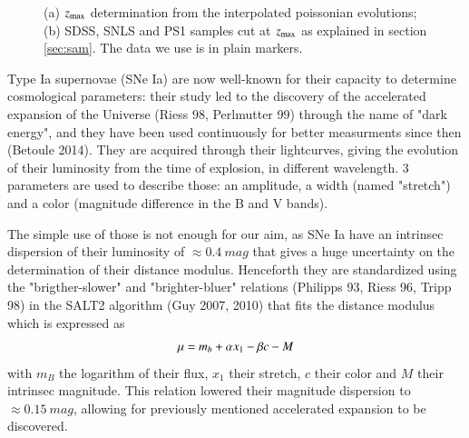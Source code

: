 \documentclass{aa}
\begin{document}
\begin{figure}[htbp!]
    \centering
    \caption{(a) $z_{\text{max}}$ determination from the interpolated poissonian
    evolutions; (b) SDSS, SNLS and PS1 samples cut at $z_{\text{max}}$ as explained in
    section \ref{sec:sam}. The data we use is in plain markers.}
\end{figure}

Type Ia supernovae (SNe Ia) are now well-known for their capacity to determine
cosmological parameters: their study led to the discovery of the accelerated
expansion of the Universe (Riess 98, Perlmutter 99) through the name of "dark
energy", and they have been used continuously for better measurments since then
(Betoule 2014). They are acquired through their lightcurves, giving the
evolution of their luminosity from the time of explosion, in different
wavelength. 3 parameters are used to describe those: an amplitude, a width
(named "stretch") and a color (magnitude difference in the B and V bands).

The simple use of those is not enough for our aim, as SNe Ia have an intrinsec
dispersion of their luminosity of $\approx 0.4~mag$ that gives a huge
uncertainty on the determination of their distance modulus. Henceforth they are
standardized using the "brigther-slower" and "brighter-bluer" relations
(Philipps 93, Riess 96, Tripp 98) in the SALT2 algorithm (Guy 2007, 2010) that
fits the distance modulus which is expressed as
\begin{equation}
    \mu = m_b + \alpha x_1 - \beta c - M
\end{equation}
with $m_B$ the logarithm of their flux, $x_1$ their stretch, $c$ their color and
$M$ their intrinsec magnitude. This relation lowered their magnitude dispersion
to $\approx 0.15~mag$, allowing for previously mentioned accelerated
expansion to be discovered.
\end{document}
